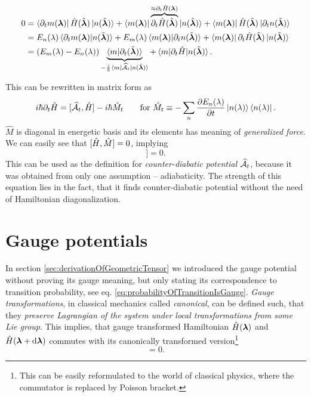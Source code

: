 \begin{equation}
    \begin{split}
        0&=\bra{\partial_t m(\llambda)}\HH(\tilde \llambda)\ket{n(\tilde\llambda)}+ \bra{m(\llambda)}\overbrace{\partial_t\HH(\tilde \llambda)}^{\approx \partial_t\HH(\llambda)}\ket{n(\tilde\llambda)}+ \bra{m(\llambda)}\HH(\tilde \llambda)\ket{\partial_t n(\tilde \llambda)}\\
        &=E_n(\lambda)\braket{\partial_t m(\llambda)|n(\tilde \llambda)} + E_m(\lambda)\braket{m(\llambda)|\partial_t n(\tilde \llambda)}+ \bra{m(\llambda)}\partial_t \HH(\tilde\llambda)\ket{n(\tilde \llambda)}\\
        &= (E_m(\lambda)-E_n(\lambda))\underbrace{\braket{m|\partial_t (\tilde \llambda)}}_{-\frac{i}{\hbar}\bra{m}\AA_t\ket{n(\tilde \llambda)}} + \braket{m|\partial_t\HH|n(\tilde \llambda)}.
    \end{split}
\end{equation}

This can be rewritten in matrix form as
\begin{equation}
    i\hbar\partial_t\HH=[\AA_t,\HH]-i\hbar \hat{M}_t\qquad \text{for } \hat{M}_t\equiv -\sum_n\pder{E_n(\lambda)}{t}\ket{n(\lambda)}\bra{n(\lambda)}.
\end{equation}
$\hat{M}$ is diagonal in energetic basis and its elements has meaning of \emph{generalized force}. We can easily see that $[\HH,\hat{M}]=0$, implying
\begin{equation}
    [\HH,i\hbar\partial_t\HH-[\AA_t,\HH]]=0.
    \label{eq:komutation}
\end{equation}
This can be used as the definition for \emph{counter-diabatic potential} $\AA_t$, because it was obtained from only one assumption -- adiabaticity. The strength of this equation lies in the fact, that it finds counter-diabatic potential without the need of Hamiltonian diagonalization.

\section{Gauge potentials}
In section \ref{sec:derivationOfGeometricTensor} we introduced the gauge potential without proving its gauge meaning, but only stating its correspondence to transition probability, see eq. \ref{eq:probabilityOfTransitionIsGauge}.
\emph{Gauge transformations}, in classical mechanics called \emph{canonical}, can be defined such, that they \emph{preserve Lagrangian of the system under local transformations from some Lie group}. This implies, that gauge transformed Hamiltonian $\HH(\llambda)$ and $\HH(\llambda+\d \llambda)$ commutes with its canonically transformed version\footnote{This can be easily reformulated to the world of classical physics, where the commutator is replaced by Poisson bracket.} 
 \begin{equation}
     [\HH(\llambda),\HH(\llambda+\delta \llambda)]=0.
 \end{equation}

